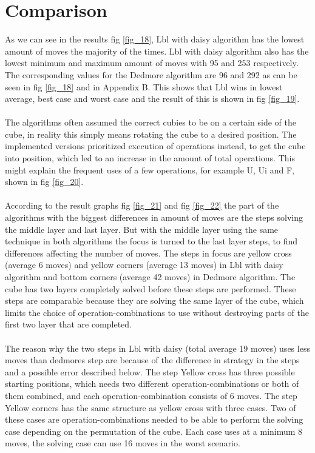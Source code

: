 \documentclass[a4paper,11pt]{kth-mag}
\begin{document}
\section{Comparison}
As we can see in the results fig \ref{fig_18}, Lbl with daisy algorithm has the lowest amount of moves the majority of the times. Lbl with daisy algorithm also has the lowest minimum and maximum amount of moves with 95 and 253 respectively. The corresponding values for the Dedmore algorithm are 96 and 292 as can be seen in fig \ref{fig_18} and in Appendix B. This shows that Lbl wins in lowest average, best case and worst case and the result of this is shown in fig \ref{fig_19}.\\\\
The algorithms often assumed the correct cubies to be on a certain side of the cube, in reality this simply means rotating the cube to a desired position. The implemented versions prioritized execution of operations instead, to get the cube into position, which led to an increase in the amount of total operations. This might explain the frequent uses of a few operations, for example U, Ui and F, shown in fig \ref{fig_20}.\\\\
According to the result graphs fig \ref{fig_21} and fig \ref{fig_22} the part of the algorithms with the biggest differences in amount of moves are the steps solving the middle layer and last layer. But with the middle layer using the same technique in both algorithms the focus is turned to the last layer steps, to find differences affecting the number of moves. The steps in focus are yellow cross (average 6 moves) and yellow corners (average 13 moves) in Lbl with daisy algorithm and bottom corners (average 42 moves) in Dedmore algorithm. The cube has two layers completely solved before these steps are performed. These steps are comparable because they are solving the same layer of the cube, which limits the choice of operation-combinations to use without destroying parts of the first two layer that are completed.\\\\ 
The reason why the two steps in Lbl with daisy (total average 19 moves) uses less moves than dedmores step are because of the difference in strategy in the steps and a possible error described below.
The step Yellow cross has three possible starting positions, which needs two different operation-combinations or both of them combined, and each operation-combination consists of 6 moves.
The step Yellow corners has the same structure as yellow cross with three cases. Two of these cases are operation-combinations needed to be able to perform the solving case depending on the permutation of the cube. Each case uses at a minimum 8 moves, the solving case can use 16 moves in the worst scenario.\\\\
\end{document}
